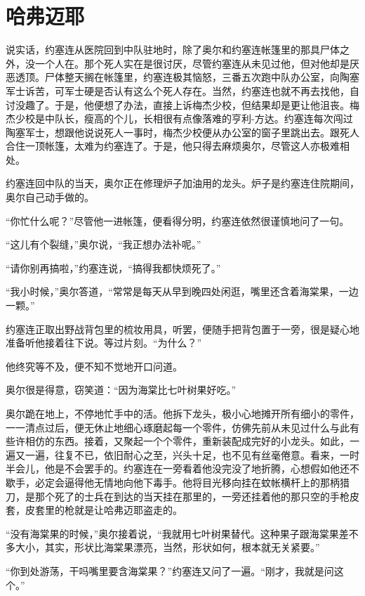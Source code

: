 \chapter{哈弗迈耶}
 
    说实话，约塞连从医院回到中队驻地时，除了奥尔和约塞连帐篷里的那具尸体之外，没一个人在。那个死人实在是很讨厌，尽管约塞连从未见过他，但对他却是厌恶透顶。尸体整天搁在帐篷里，约塞连极其恼怒，三番五次跑中队办公室，向陶塞军士诉苦，可军士硬是否认有这么个死人存在。当然，约塞连也就不再去找他，自讨没趣了。于是，他便想了办法，直接上诉梅杰少校，但结果却是更让他沮丧。梅杰少校是中队长，瘦高的个儿，长相很有点像落难的亨利-方达。约塞连每次闯过陶塞军士，想跟他说说死人一事时，梅杰少校便从办公室的窗子里跳出去。跟死人合住一顶帐篷，太难为约塞连了。于是，他只得去麻烦奥尔，尽管这人亦极难相处。

    约塞连回中队的当天，奥尔正在修理炉子加油用的龙头。炉子是约塞连住院期间，奥尔自己动手做的。

    “你忙什么呢？”尽管他一进帐篷，便看得分明，约塞连依然很谨慎地问了一句。

    “这儿有个裂缝，”奥尔说，“我正想办法补呢。”

    “请你别再搞啦，”约塞连说，“搞得我都快烦死了。”

    “我小时候，”奥尔答道，“常常是每天从早到晚四处闲逛，嘴里还含着海棠果，一边一颗。”

    约塞连正取出野战背包里的梳妆用具，听罢，便随手把背包置于一旁，很是疑心地准备听他接着往下说。等过片刻。“为什么？”

    他终究等不及，便不知不觉地开口问道。

    奥尔很是得意，窃笑道：“因为海棠比七叶树果好吃。”

    奥尔跪在地上，不停地忙手中的活。他拆下龙头，极小心地摊开所有细小的零件，一一清点过后，便无休止地细心琢磨起每一个零件，仿佛先前从未见过什么与此有些许相仿的东西。接着，又聚起一个个零件，重新装配成完好的小龙头。如此，一遍又一遍，往复不已，依旧耐心之至，兴头十足，也不见有丝毫倦意。看来，一时半会儿，他是不会罢手的。约塞连在一旁看着他没完没了地折腾，心想假如他还不歇手，必定会逼得他无情地向他下毒手。他将目光移向挂在蚊帐横杆上的那柄猎刀，是那个死了的士兵在到达的当天挂在那里的，一旁还挂着他的那只空的手枪皮套，皮套里的枪就是让哈弗迈耶盗走的。

    “没有海棠果的时候，”奥尔接着说，“我就用七叶树果替代。这种果子跟海棠果差不多大小，其实，形状比海棠果漂亮，当然，形状如何，根本就无关紧要。”

    “你到处游荡，干吗嘴里要含海棠果？”约塞连又问了一遍。“刚才，我就是问这个。”

